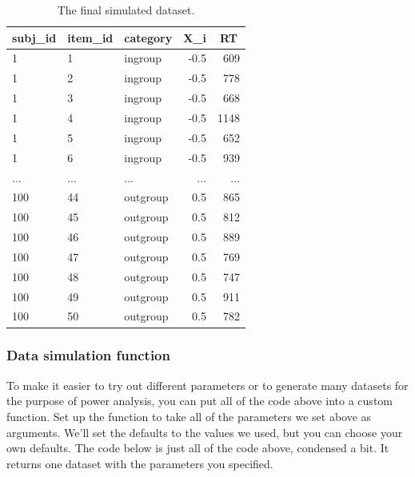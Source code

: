 \documentclass[english,doc,floatsintext]{apa6}
\begin{document}
\begin{table}[H]

\begin{center}
\begin{threeparttable}

\caption{\label{tab:dat-sim-table}The final simulated dataset.}

\begin{tabular}{lllrr}
\toprule
subj\_id & \multicolumn{1}{c}{item\_id} & \multicolumn{1}{c}{category} & \multicolumn{1}{c}{X\_i} & \multicolumn{1}{c}{RT}\\
\midrule
1 & 1 & ingroup & -0.5 & 609\\
1 & 2 & ingroup & -0.5 & 778\\
1 & 3 & ingroup & -0.5 & 668\\
1 & 4 & ingroup & -0.5 & 1148\\
1 & 5 & ingroup & -0.5 & 652\\
1 & 6 & ingroup & -0.5 & 939\\
... & ... & ... & ... & ...\\
100 & 44 & outgroup & 0.5 & 865\\
100 & 45 & outgroup & 0.5 & 812\\
100 & 46 & outgroup & 0.5 & 889\\
100 & 47 & outgroup & 0.5 & 769\\
100 & 48 & outgroup & 0.5 & 747\\
100 & 49 & outgroup & 0.5 & 911\\
100 & 50 & outgroup & 0.5 & 782\\
\bottomrule
\end{tabular}

\end{threeparttable}
\end{center}

\end{table}

\hypertarget{data-simulation-function}{%
\subsubsection{Data simulation function}\label{data-simulation-function}}

To make it easier to try out different parameters or to generate many datasets for the purpose of power analysis, you can put all of the code above into a custom function. Set up the function to take all of the parameters we set above as arguments. We'll set the defaults to the values we used, but you can choose your own defaults. The code below is just all of the code above, condensed a bit. It returns one dataset with the parameters you specified.
\end{document}
